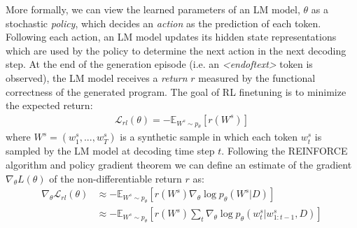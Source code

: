 \documentclass{article}
\begin{document}
\iffalse
Specifically, we sample new training samples during and exploit the feedback received when passing these code samples to unit tests.
We use these feedback to estimate the return signals for an actor-critic training framework. 
The return estimation received from the critic is used to reward/ penalize LMs against predicted token's probabilities on these training samples. 
As noted from prior RL methods in other research domains such as image captioning \citep{rennie2017self}, factoring evaluation metrics, i.e. the unit test results in our case, can harmonize models with respect to their test-time inference and evaluation procedure. 
\fi

More formally, we can view the learned parameters of an LM model, $\theta$ as a stochastic \emph{policy}, which decides an \emph{action} as the prediction of each token.
Following each action, an LM model updates its hidden state representations which are used by the policy to determine the next action in the next decoding step. 
At the end of the generation episode (i.e. an \emph{<endoftext>} token is observed), the LM model receives a \emph{return} $r$ measured by the functional correctness of the generated program. 
The goal of RL finetuning is to minimize the expected return: 
\begin{align}
    \mathcal{L}_{rl}(\theta) = - \mathbb{E}_{W^s \sim p_\theta} [r(W^s)]
\end{align}
where $W^s=(w^s_1, ..., w^s_T)$ is a synthetic sample in which each token $w^s_t$ is sampled by the LM model at decoding time step $t$.
Following the REINFORCE algorithm \citep{williams1992simple, sutton2018reinforcement} and policy gradient theorem \citep{sutton1999policy} we can define an estimate  of the gradient $\nabla_\theta L(\theta)$ of the non-differentiable return $r$ as: 
\begin{align}
    \nabla_\theta \mathcal{L}_{rl}(\theta) &\approx -\mathbb{E}_{W^s \sim p_\theta} [r(W^s) \nabla_\theta \log p_\theta(W^s|D)] \nonumber \\
    &\approx -\mathbb{E}_{W^s \sim p_\theta} [r(W^s)  \sum_t \nabla_\theta \log p_\theta(w^s_t|w^s_{1:t-1}, D)] \label{eq:rl_loss}
\end{align}
\end{document}
